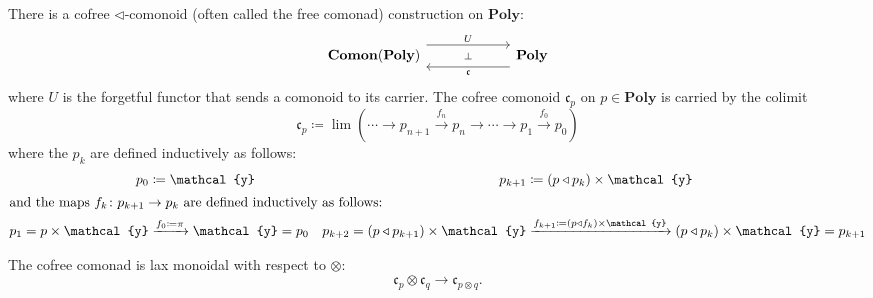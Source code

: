 \documentclass[11pt, one side, article]{memoir}
\theoremstyle{definition}
\theoremstyle{plain}
\newcommand{\Cat}[1]{\mathbf{#1}}%
\newcommand{\To}[2][]{\xrightarrow[#1]{#2}}
\newcommand{\yon}{\mathcal{y}}
\newcommand{\poly}{\Cat{Poly}}
\newcommand{\0}{\textsf{0}}
\newcommand{\1}{\tn{\textsf{1}}}
\newcommand{\tri}{\mathbin{\triangleleft}}
\begin{document}
There is a cofree $\tri$-comonoid (often called the free comonad) construction on $\poly$:
\begin{equation}
\begin{tikzcd}[column sep=60pt]
	\Cat{Comon}(\poly)
  	\ar[from=r, shift left=8pt, "\mathfrak{c}"]
		\ar[from=r, phantom, "\scriptstyle\bot"]
  	&
	\poly
		\ar[from=l, shift right=-8pt, "U"]
\end{tikzcd}
\end{equation}
where $U$ is the forgetful functor that sends a comonoid to its carrier. The cofree comonoid $\mathfrak{c}_p$ on $p\in\poly$ is carried by the colimit
\begin{equation}
\mathfrak{c}_p\coloneqq\lim(\cdots\to p_{n+1}\To{f_n} p_n\to\cdots\to p_1\To{f_0} p_0)
\end{equation}
where the $p_k$ are defined inductively as follows:
\begin{align}
	p_0&\coloneqq\yon&p_{k+1}&\coloneqq (p\tri p_k)\times\yon\\
\intertext{and the maps $f_k\colon p_{k+1}\to p_k$ are defined inductively as follows:}
	p_1=p\times\yon&\To{f_0\coloneqq\pi}\yon=p_0&p_{k+2}=(p\tri p_{k+1})\times\yon&\To{f_{k+1}\coloneqq(p\tri f_k)\times\yon}(p\tri p_{k})\times\yon=p_{k+1}
\end{align}

The cofree comonad is lax monoidal with respect to $\otimes$:
\begin{equation}
  \mathfrak{c}_p\otimes\mathfrak{c}_q\to\mathfrak{c}_{p\otimes q}.
\end{equation}
\end{document}
